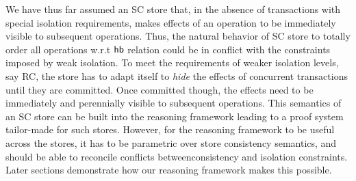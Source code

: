 We have thus far assumed an SC store that, in the absence of
transactions with special isolation requirements, makes effects of an
operation to be immediately visible to subsequent operations. Thus,
the natural behavior of SC store to totally order all operations w.r.t
$\textsf{hb}$ relation could be in conflict with the constraints imposed by
weak isolation. To meet the requirements of weaker isolation levels,
say RC, the store has to adapt itself to \emph{hide} the effects of
concurrent transactions until they are committed. Once committed
though, the effects need to be immediately and perennially visible to
subsequent operations. This semantics of an SC store can be built into
the reasoning framework leading to a proof system tailor-made for such
stores. However, for the reasoning framework to be useful across the
stores, it has to be parametric over store consistency semantics, and
should be able to reconcile conflicts betweenconsistency and isolation
constraints. Later sections demonstrate how our reasoning framework
makes this possible.
